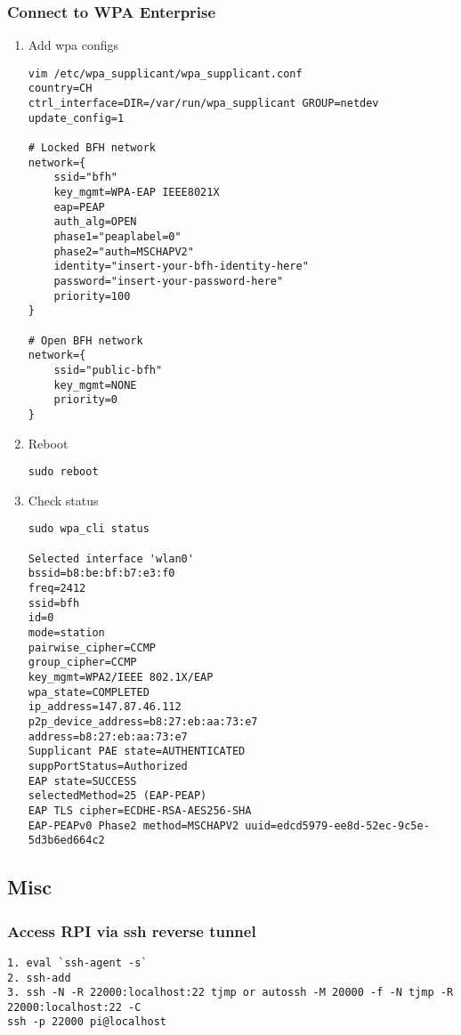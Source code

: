 \subsubsection*{Connect to WPA
Enterprise}\label{connect-to-wpa-enterprise}

\begin{enumerate}
\def\labelenumi{\arabic{enumi}.}
\item
  Add wpa configs

\begin{verbatim}
vim /etc/wpa_supplicant/wpa_supplicant.conf
country=CH
ctrl_interface=DIR=/var/run/wpa_supplicant GROUP=netdev
update_config=1

# Locked BFH network
network={
    ssid="bfh"
    key_mgmt=WPA-EAP IEEE8021X
    eap=PEAP
    auth_alg=OPEN
    phase1="peaplabel=0"
    phase2="auth=MSCHAPV2"
    identity="insert-your-bfh-identity-here"
    password="insert-your-password-here"
    priority=100
}

# Open BFH network
network={
    ssid="public-bfh"
    key_mgmt=NONE
    priority=0
}
\end{verbatim}
\item
  Reboot

\begin{verbatim}
sudo reboot
\end{verbatim}
\item
  Check status

\begin{verbatim}
sudo wpa_cli status

Selected interface 'wlan0'
bssid=b8:be:bf:b7:e3:f0
freq=2412
ssid=bfh
id=0
mode=station
pairwise_cipher=CCMP
group_cipher=CCMP
key_mgmt=WPA2/IEEE 802.1X/EAP
wpa_state=COMPLETED
ip_address=147.87.46.112
p2p_device_address=b8:27:eb:aa:73:e7
address=b8:27:eb:aa:73:e7
Supplicant PAE state=AUTHENTICATED
suppPortStatus=Authorized
EAP state=SUCCESS
selectedMethod=25 (EAP-PEAP)
EAP TLS cipher=ECDHE-RSA-AES256-SHA
EAP-PEAPv0 Phase2 method=MSCHAPV2 uuid=edcd5979-ee8d-52ec-9c5e-5d3b6ed664c2
\end{verbatim}
\end{enumerate}

\subsection*{Misc}\label{misc}

\subsubsection*{Access RPI via ssh reverse
tunnel}\label{access-rpi-via-ssh-reverse-tunnel}

\begin{verbatim}
1. eval `ssh-agent -s`
2. ssh-add
3. ssh -N -R 22000:localhost:22 tjmp or autossh -M 20000 -f -N tjmp -R 22000:localhost:22 -C
ssh -p 22000 pi@localhost
\end{verbatim}